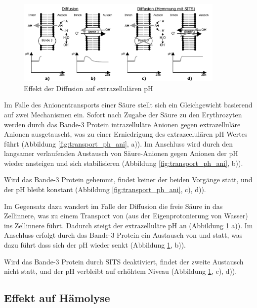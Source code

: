 \documentclass[a4paper,german]{scrreprt}
\begin{document}
\begin{figure}[h]
	\centering
	\includegraphics[width=0.9\textwidth]{img/th_transport_ph_diff}
	\caption{Effekt der Diffusion auf extrazellulären pH}
	\label{fig:transport_ph_diff}
\end{figure}

Im Falle des Anionentransports einer Säure stellt sich ein Gleichgewicht
basierend auf zwei Mechanismen ein. Sofort nach Zugabe der Säure zu den
Erythrozyten werden durch das Bande-3 Protein intrazelluläre  Anionen
gegen extrazelluläre  Anionen ausgetauscht, was zu einer Erniedrigung
des extrazeelulären pH Wertes führt (Abbildung \ref{fig:transport_ph_ani}, a)).
Im Anschluss wird durch den langsamer verlaufenden Austausch von Säure-Anionen
gegen  Anionen der pH wieder ansteigen und sich stabilisieren
(Abbildung \ref{fig:transport_ph_ani}, b)).

Wird das Bande-3 Protein gehemmt, findet keiner der beiden Vorgänge statt, und
der pH bleibt konstant (Abbildung \ref{fig:transport_ph_ani}, c), d)).

Im Gegensatz dazu wandert im Falle der Diffusion die freie Säure in das
Zellinnere, was zu einem Transport von  (aus der Eigenprotonierung von
Wasser) ins Zellinnere führt. Dadurch steigt der extrazelluläre pH an
(Abbildung \ref{fig:transport_ph_diff} a)). Im Anschluss erfolgt durch das
Bande-3 Protein ein Austausch von  und  statt, was dazu führt
dass sich der pH wieder senkt (Abbildung \ref{fig:transport_ph_diff}, b)).

Wird das Bande-3 Protein durch SITS deaktiviert, findet der zweite Austausch
nicht statt, und der pH verbleibt auf erhöhtem Niveau (Abbildung
\ref{fig:transport_ph_diff}, c), d)).

\subsection{Effekt auf Hämolyse}
\end{document}
